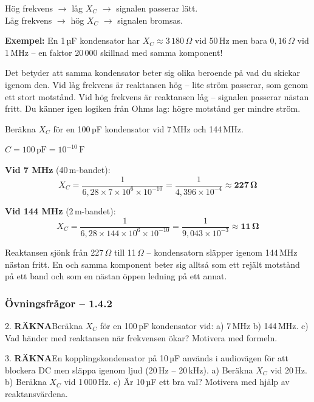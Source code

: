 \documentclass[a4paper,11pt,twoside]{book}
\newcommand{\emoji}[1]{{\emojifont #1}}
\newcommand{\qrakna}{\colorbox{bluepale}{\textcolor{bluedark}{\headingfont\bfseries\tiny RÄKNA}}}
\begin{document}
\begin{bluebox}[title={\emoji{🔑} Nyckelsamband -- reaktansen minskar när frekvensen ökar}]
Hög frekvens $\rightarrow$ låg $X_C$ $\rightarrow$ signalen passerar lätt.\\
Låg frekvens $\rightarrow$ hög $X_C$ $\rightarrow$ signalen bromsas.

\medskip
\textbf{Exempel:} En 1\,µF kondensator har $X_C \approx 3\,180\,\Omega$ vid 50\,Hz men bara $0{,}16\,\Omega$ vid 1\,MHz -- en faktor 20\,000 skillnad med samma komponent!
\end{bluebox}

Det betyder att samma kondensator beter sig olika beroende på vad du skickar igenom den. Vid låg frekvens är reaktansen hög -- lite ström passerar, som genom ett stort motstånd. Vid hög frekvens är reaktansen låg -- signalen passerar nästan fritt. Du känner igen logiken från Ohms lag: högre motstånd ger mindre ström.

\begin{worked}[title={Räkneexempel 1.4.2-1 -- Reaktans vid två frekvenser}]
Beräkna $X_C$ för en 100\,pF kondensator vid 7\,MHz och 144\,MHz.

$C = 100\,\text{pF} = 10^{-10}\,\text{F}$

\textbf{Vid 7 MHz} (40\,m-bandet):
\[ X_C = \frac{1}{6{,}28 \times 7 \times 10^6 \times 10^{-10}} = \frac{1}{4{,}396 \times 10^{-4}} \approx \mathbf{227\,\Omega} \]

\textbf{Vid 144 MHz} (2\,m-bandet):
\[ X_C = \frac{1}{6{,}28 \times 144 \times 10^6 \times 10^{-10}} = \frac{1}{9{,}043 \times 10^{-3}} \approx \mathbf{11\,\Omega} \]

Reaktansen sjönk från 227\,$\Omega$ till 11\,$\Omega$ -- kondensatorn släpper igenom 144\,MHz nästan fritt. En och samma komponent beter sig alltså som ett rejält motstånd på ett band och som en nästan öppen ledning på ett annat.
\end{worked}

\subsubsection*{Övningsfrågor -- 1.4.2}

\begin{qblock}{2.}
\qrakna\quad Beräkna $X_C$ för en 100\,pF kondensator vid: a) 7\,MHz \quad b) 144\,MHz. \quad c) Vad händer med reaktansen när frekvensen ökar? Motivera med formeln.
\end{qblock}

\begin{qblock}{3.}
\qrakna\quad En kopplingskondensator på 10\,µF används i audiovägen för att blockera DC men släppa igenom ljud (20\,Hz -- 20\,kHz). a) Beräkna $X_C$ vid 20\,Hz. b) Beräkna $X_C$ vid 1\,000\,Hz. c) Är 10\,µF ett bra val? Motivera med hjälp av reaktansvärdena.
\end{qblock}
\end{document}
